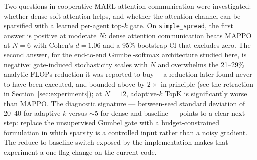 Two questions in cooperative MARL attention communication were
investigated: whether dense soft attention helps, and whether the
attention channel can be sparsified with a learned per-agent top-$k$
gate. On \texttt{simple\_spread}, the first answer is positive at
moderate $N$: dense attention communication beats MAPPO at $N{=}6$ with
Cohen's $d{=}1.06$ and a 95\% bootstrap CI that excludes zero. The
second answer, for the end-to-end Gumbel-softmax architecture studied
here, is negative: gate-induced stochasticity scales with $N$ and
overwhelms the 21--29\% analytic FLOPs reduction it was reported to buy
---a reduction later found never to have been executed, and bounded above by
$2\times$ in principle (see the retraction in Section~\ref{sec:experiments});
at $N{=}12$,
adaptive-$k$ TopK is significantly worse than MAPPO. The diagnostic
signature --- between-seed standard deviation of 20--40 for adaptive-$k$
versus $\sim 5$ for dense and baseline --- points to a clear next step:
replace the unsupervised Gumbel gate with a budget-constrained
formulation in which sparsity is a controlled input rather than a noisy
gradient. The reduce-to-baseline switch exposed by the implementation
makes that experiment a one-flag change on the current code.
